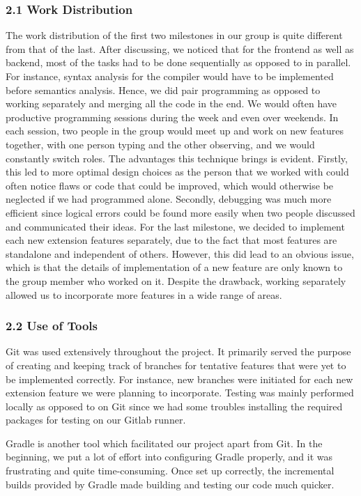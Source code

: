 \documentclass[10pt,a4paper,]{report}
\begin{document}
  \subsubsection*{2.1 Work Distribution}
  The work distribution of the first two milestones in our group is quite
  different from that of the last. After discussing, we noticed that for the
  frontend as well as backend, most of the tasks had to be done sequentially as
  opposed to in parallel. For instance, syntax analysis for the compiler would
  have to be implemented before semantics analysis. Hence, we did pair
  programming as opposed to working separately and merging all the code in the
  end. We would often have productive programming sessions during the week and
  even over weekends. In each session, two people in the group would meet up and
  work on new features together, with one person typing and the other observing,
  and we would constantly switch roles. The advantages this technique brings is
  evident. Firstly, this led to more optimal design choices as the person that
  we worked with could often notice flaws or code that could be improved, which
  would otherwise be neglected if we had programmed alone. Secondly, debugging
  was much more efficient since logical errors could be found more easily when
  two people discussed and communicated their ideas.
  For the last milestone, we decided to implement each new extension features
  separately, due to the fact that most features are standalone and independent
  of others. However, this did lead to an obvious issue, which is that the
  details of implementation of a new feature are only known to the group member
  who worked on it. Despite the drawback, working separately allowed us to
  incorporate more features in a wide range of areas.

  \subsubsection*{2.2 Use of Tools}
  Git was used extensively throughout the project. It primarily served the
  purpose of creating and keeping track of branches for tentative features that
  were yet to be implemented correctly. For instance, new branches were
  initiated for each new extension feature we were planning to incorporate.
  Testing was mainly performed locally as opposed to on Git since we had some
  troubles installing the required packages for testing on our Gitlab runner.

  Gradle is another tool which facilitated our project apart from Git. In the
  beginning, we put a lot of effort into configuring Gradle properly, and it was
  frustrating and quite time-consuming. Once set up correctly, the incremental
  builds provided by Gradle made building and testing our code much quicker.
\end{document}
